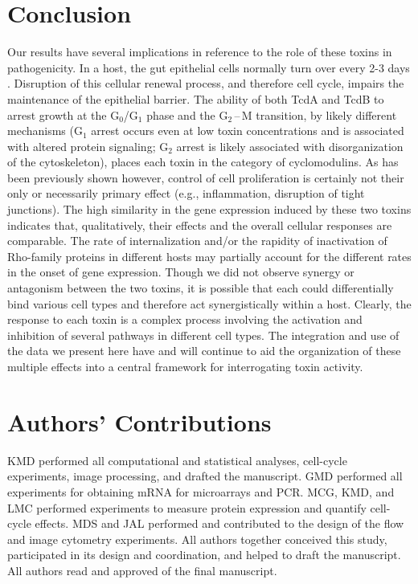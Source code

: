 \section{Conclusion}
Our results have several implications in reference to the 
role of these toxins in pathogenicity. In a host, the gut 
epithelial cells normally turn over every 2-3 days 
\cite{Kim:2010ja}. Disruption of this cellular renewal 
process, and therefore cell cycle, impairs the 
maintenance of the epithelial barrier. The ability of 
both TcdA and TcdB to arrest growth at the 
G$_{\text{0}}$/G$_{\text{1}}$ phase and the 
G$_{\text{2}}$\,--\,M transition, by likely different 
mechanisms (G$_{\text{1}}$ arrest occurs even at low 
toxin concentrations and is associated with altered 
protein signaling; G$_{\text{2}}$ arrest is likely 
associated with disorganization of the cytoskeleton), 
places each toxin in the category of cyclomodulins. 
As has been previously shown however, control of 
cell proliferation is certainly not their only or 
necessarily primary effect (e.g., inflammation, 
disruption of tight junctions). The high similarity 
in the gene expression induced by these two toxins 
indicates that, qualitatively, their effects and 
the overall cellular responses are comparable. The 
rate of internalization and/or the rapidity of 
inactivation of Rho-family proteins in different 
hosts may partially account for the different 
rates in the onset of gene expression. Though we did 
not observe synergy or antagonism between the two 
toxins, it is possible that each could differentially 
bind various cell types and therefore act synergistically 
within a host. Clearly, the response to each toxin 
is a complex process involving the activation and 
inhibition of several pathways in different cell 
types. The integration and use of the data we present 
here have and will continue to aid the organization 
of these multiple effects into a central framework 
for interrogating toxin activity.

\section{Authors' Contributions}
KMD performed all computational and statistical 
analyses, cell-cycle experiments, image processing, 
and drafted the manuscript. GMD performed all 
experiments for obtaining mRNA for microarrays and PCR. 
MCG, KMD, and LMC performed experiments to measure protein 
expression and quantify cell-cycle effects. MDS and 
JAL performed and contributed to the design of the 
flow and image cytometry experiments. All authors 
together conceived this study, participated in its 
design and coordination, and helped to draft the 
manuscript. All authors read and approved of 
the final manuscript.

